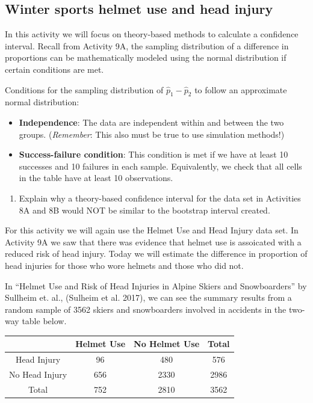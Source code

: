 \documentclass[
]{report}
\providecommand{\tightlist}{%
  \setlength{\itemsep}{0pt}\setlength{\parskip}{0pt}}
\begin{document}
\hypertarget{winter-sports-helmet-use-and-head-injury}{%
\subsection{Winter sports helmet use and head injury}\label{winter-sports-helmet-use-and-head-injury}}

In this activity we will focus on theory-based methods to calculate a confidence interval. Recall from Activity 9A, the sampling distribution of a difference in proportions can be mathematically modeled using the normal distribution if certain conditions are met.

Conditions for the sampling distribution of \(\hat{p}_1-\hat{p}_2\) to follow an approximate normal distribution:

\begin{itemize}
\item
  \textbf{Independence}: The data are independent within and between the two groups. (\emph{Remember}: This also must be true to use simulation methods!)
\item
  \textbf{Success-failure condition}: This condition is met if we have at least 10 successes and 10 failures in each sample. Equivalently, we check that all cells in the table have at least 10 observations.
\end{itemize}

\begin{enumerate}
\def\labelenumi{\arabic{enumi}.}
\tightlist
\item
  Explain why a theory-based confidence interval for the data set in Activities 8A and 8B would NOT be similar to the bootstrap interval created.
\end{enumerate}

\vspace{1in}

For this activity we will again use the Helmet Use and Head Injury data set. In Activity 9A we saw that there was evidence that helmet use is assoicated with a reduced risk of head injury. Today we will estimate the difference in proportion of head injuries for those who wore helmets and those who did not.

In ``Helmet Use and Risk of Head Injuries in Alpine Skiers and Snowboarders'' by Sullheim et. al., (Sulheim et al. 2017), we can see the summary results from a random sample of 3562 skiers and snowboarders involved in accidents in the two-way table below.

\begin{longtable}[]{@{}cccc@{}}
\toprule()
& Helmet Use & No Helmet Use & Total \\
\midrule()
\endhead
Head Injury & 96 & 480 & 576 \\
No Head Injury & 656 & 2330 & 2986 \\
Total & 752 & 2810 & 3562 \\
\bottomrule()
\end{longtable}
\end{document}
